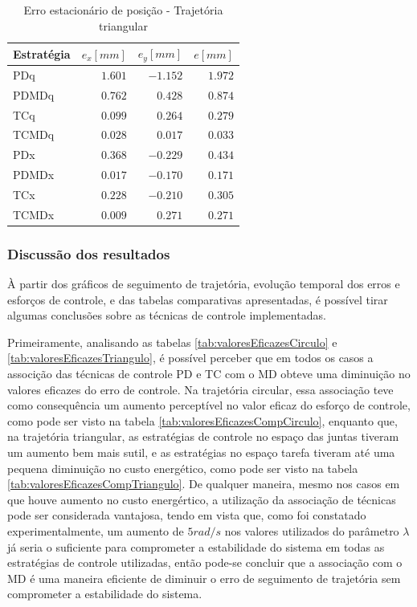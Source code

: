 \documentclass[]{politex}
\begin{document}
\begin{table}[H] 
\centering
\caption{Erro estacionário de posição - Trajetória triangular}
\label{tab:valorFinalTriangulo}
\begin{tabular}{l|r|r|r}
Estratégia & $e_x [mm]$ & $e_y [mm]$ & $e [mm]$ \\ \hline
PDq        & $ 1.601$   & $-1.152$   & $1.972$  \\
PDMDq      & $ 0.762$   & $ 0.428$   & $0.874$  \\
TCq        & $ 0.099$   & $ 0.264$   & $0.279$  \\
TCMDq      & $ 0.028$   & $ 0.017$   & $0.033$  \\
PDx        & $ 0.368$   & $-0.229$   & $0.434$  \\
PDMDx      & $ 0.017$   & $-0.170$   & $0.171$  \\
TCx        & $ 0.228$   & $-0.210$   & $0.305$  \\
TCMDx      & $ 0.009$   & $ 0.271$   & $0.271$  \\
\end{tabular}
\end{table}

\subsubsection{Discussão dos resultados}

À partir dos gráficos de seguimento de trajetória, evolução temporal dos erros e esforços de controle, e das tabelas comparativas apresentadas, é possível tirar algumas conclusões sobre as técnicas de controle implementadas.

Primeiramente, analisando as tabelas \ref{tab:valoresEficazesCirculo} e \ref{tab:valoresEficazesTriangulo}, é possível perceber que em todos os casos a associção das técnicas de controle PD e TC com o MD obteve uma diminuição no valores eficazes do erro de controle. Na trajetória circular, essa associação teve como consequência um aumento perceptível no valor eficaz do esforço de controle, como pode ser visto na tabela \ref{tab:valoresEficazesCompCirculo}, enquanto que, na trajetória triangular, as estratégias de controle no espaço das juntas tiveram um aumento bem mais sutil, e as estratégias no espaço tarefa tiveram até uma pequena diminuição no custo energético, como pode ser visto na tabela \ref{tab:valoresEficazesCompTriangulo}. De qualquer maneira, mesmo nos casos em que houve aumento no custo energértico, a utilização da associação de técnicas pode ser considerada vantajosa, tendo em vista que, como foi constatado experimentalmente, um aumento de $5rad/s$ nos valores utilizados do parâmetro $\lambda$  já seria o suficiente para comprometer a estabilidade do sistema em todas as estratégias de controle utilizadas, então pode-se concluir que a associação com o MD é uma maneira eficiente de diminuir o erro de seguimento de trajetória sem comprometer a estabilidade do sistema.  
\end{document}
